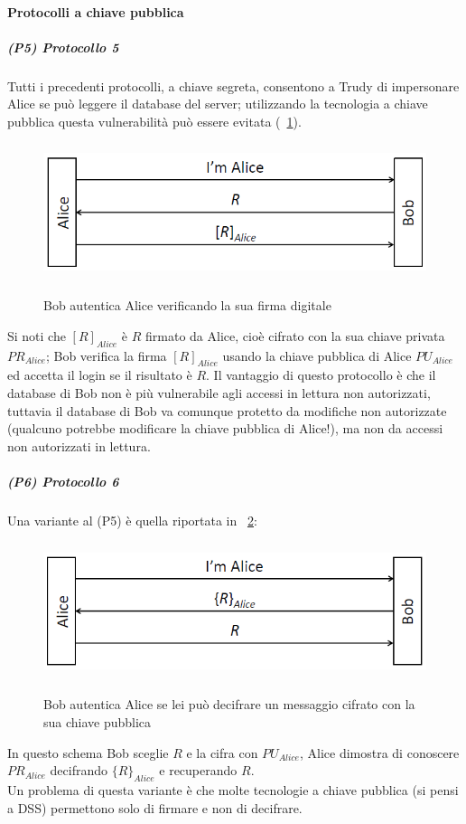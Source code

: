 \paragraph{Protocolli a chiave pubblica}
\subparagraph{(P5) Protocollo 5}
Tutti i precedenti protocolli, a chiave segreta, consentono a Trudy di impersonare Alice se può leggere il database del server; utilizzando la tecnologia a chiave pubblica questa vulnerabilità può essere evitata (\figurename~\ref{fig:ImgS26bis}).
\begin{figure}[htbp]
	\centering%
	\subfigure%
	{\includegraphics[height=4cm, width=12cm, keepaspectratio]{Immagini/autenticazione/ImgS26bis.png}}
	\caption{Bob autentica Alice verificando la sua firma digitale}\label{fig:ImgS26bis} 	
\end{figure}
Si noti che $[R]_{Alice}$ è $R$ firmato da Alice, cioè cifrato con la sua chiave privata $PR_{Alice}$; Bob verifica la firma $[R]_{Alice}$ usando la chiave pubblica di Alice $PU_{Alice}$ ed accetta il login se il risultato è $R$. Il vantaggio di questo protocollo è che il database di Bob non è più vulnerabile agli accessi in lettura non
autorizzati, tuttavia il database di Bob va comunque protetto da modifiche non autorizzate (qualcuno potrebbe modificare la chiave pubblica di Alice!), ma non da accessi non autorizzati in lettura.
\subparagraph{(P6) Protocollo 6}
Una variante al (P5) è quella riportata in \figurename~\ref{fig:ImgS28bis}:
\begin{figure}[htbp]
	\centering%
	\subfigure%
	{\includegraphics[height=4cm, width=12cm, keepaspectratio]{Immagini/autenticazione/ImgS28bis.png}}
	\caption{Bob autentica Alice se lei può decifrare un messaggio cifrato con la sua chiave pubblica}\label{fig:ImgS28bis} 	
\end{figure}
In questo schema Bob sceglie $R$ e la cifra con $PU_{Alice}$, Alice dimostra di conoscere $PR_{Alice}$ decifrando $\lbrace R\rbrace_{Alice}$ e recuperando $R$.\\
Un problema di questa variante è che molte tecnologie a chiave pubblica (si pensi a DSS) permettono solo di firmare
e non di decifrare.

